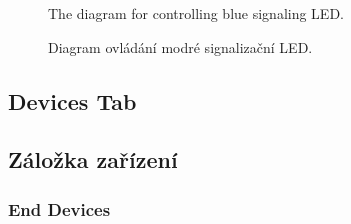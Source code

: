 \begin{English}
\begin{figure}[H]
    \centering
    \def\svgwidth{1\columnwidth}
    \graphicspath{{pictures/czech/software/svg/}}
    
    \caption{The diagram for controlling blue signaling LED.}
    \label{fig:diagram-blue-led-indication}
\end{figure}
\end{English}

\begin{Czech}
\begin{figure}[H]
    \centering
    \def\svgwidth{1\columnwidth}
    \graphicspath{{pictures/czech/software/svg/}}
    
    \caption{Diagram ovládání modré signalizační LED.}
    \label{fig:diagram-blue-led-indication}
\end{figure}
\end{Czech}


\begin{English}
\end{English}

\begin{Czech}
\end{Czech}


\begin{English}
\subsection{Devices Tab}
\end{English}

\begin{Czech}
\subsection{Záložka zařízení}
\end{Czech}


\begin{English}
\subsubsection{End Devices}
\end{English}

